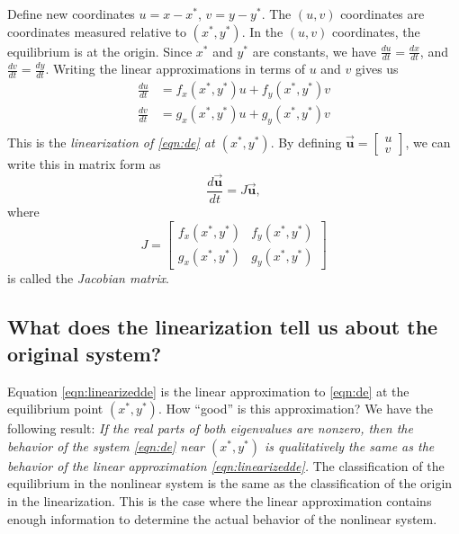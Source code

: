 \documentclass[reqno]{immbook}
\newcommand{\BU}{\vec{\textbf{u}}}
\numberwithin{equation}{chapter}
\numberwithin{question}{section}
\numberwithin{theorem}{chapter}
\numberwithin{figure}{chapter}
\theoremstyle{definition}
\begin{document}
Define new coordinates $u = x-x^*$, $v = y-y^*$.
The $(u,v)$ coordinates are coordinates measured relative to $(x^*,y^*)$.
In the $(u,v)$ coordinates, the equilibrium is at the origin.
Since $x^*$ and $y^*$ are constants, we have $\frac{du}{dt} = \frac{dx}{dt}$,
and $\frac{dv}{dt} = \frac{dy}{dt}$.  Writing the linear approximations
in terms of $u$ and $v$ gives us
\begin{equation}
\begin{split}
  \frac{du}{dt} & = f_x(x^*,y^*)u + f_y(x^*,y^*)v \\
  \frac{dv}{dt} & = g_x(x^*,y^*)u + g_y(x^*,y^*)v \\
\end{split}
\end{equation}
This is the \emph{linearization of \eqref{eqn:de} at $(x^*,y^*)$}.
By defining $\BU = \begin{bmatrix} u \\ v \end{bmatrix}$, we can write
this in matrix form as
\begin{equation}
  \frac{d\BU}{dt} = J\BU,
\label{eqn:linearizedde}
\end{equation}
where
\begin{equation}
   J = \begin{bmatrix}
             f_x(x^*,y^*) & f_y(x^*,y^*) \\
	     g_x(x^*,y^*) & g_y(x^*,y^*)
       \end{bmatrix}
\label{eqn:jac}
\end{equation}
is called the \emph{Jacobian matrix}.

\subsection*{What does the linearization tell us about the original system?}
Equation \eqref{eqn:linearizedde}
is the linear approximation to \eqref{eqn:de} at the
equilibrium point $(x^*,y^*)$.
How ``good'' is this approximation?
We have the following result:
\emph{If the real parts of both eigenvalues
are nonzero, then the behavior of the system \eqref{eqn:de}
near $(x^*,y^*)$ is qualitatively the same as the behavior of the
linear approximation \eqref{eqn:linearizedde}.}
The classification of the equilibrium in the nonlinear system
is the same as the classification of the origin in
the linearization.
This is the case where the linear approximation contains
enough information to determine the actual behavior of the
nonlinear system.
\end{document}
